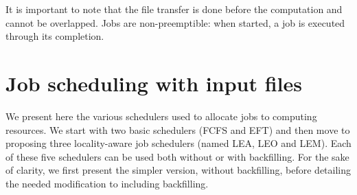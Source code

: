 \documentclass[conference,10pt]{IEEEtran}
\newcommand{\Node}[1]{\ensuremath{\mathrm{Node}_{#1}}\xspace}
\newcommand{\file}{\ensuremath{\mathit{File}}\xspace}
\newcommand{\size}{\ensuremath{\mathit{Size}}\xspace}
\newcommand{\bandwidth}{\mathit{BandWidth}\xspace}
\newcommand{\walltime}{\mathit{WallTime}\xspace}
\newcommand{\start}{\mathit{StartTime}\xspace}
\begin{document}

It is important to note that the file transfer is done before the computation and cannot be overlapped.
Jobs are non-preemptible: when started, a job is executed through its completion.


\section{Job scheduling with input files}\label{sec.schedulers}


We present here the various schedulers used to allocate jobs to
computing resources. We start with two basic schedulers (FCFS and EFT)
and then move to proposing three locality-aware job schedulers (named
LEA, LEO and LEM). Each of these five schedulers can be used both
without or with backfilling. For the sake of clarity, we first present
the simpler version, without backfilling, before detailing the needed
modification to including backfilling.
\end{document}
